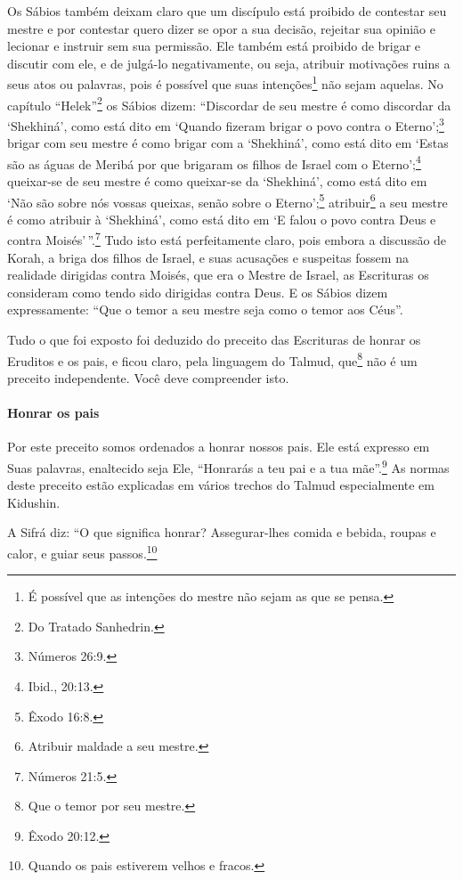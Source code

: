 Os Sábios também deixam claro que um discípulo está proibido de
contestar seu mestre e por contestar quero dizer se opor a sua decisão,
rejeitar sua opinião e lecionar e instruir sem sua permissão. Ele também
está proibido de brigar e discutir com ele, e de julgá-lo negativamente,
ou seja, atribuir motivações ruins a seus atos ou palavras, pois é
possível que suas intenções\footnote{É possível que as intenções do mestre não sejam as que se pensa.} não
sejam aquelas. No capítulo ``Helek''\footnote{Do Tratado Sanhedrin.} os Sábios
dizem: ``Discordar de seu mestre
é como discordar da `Shekhiná', como está dito em `Quando fizeram brigar
o povo contra o Eterno';\footnote{Números 26:9.} brigar com seu mestre é como
brigar com a `Shekhiná', como está dito em `Estas são as águas de Meribá
por que brigaram os filhos de Israel com o Eterno';\footnote{Ibid., 20:13.}
queixar-se de seu mestre
é como queixar-se da `Shekhiná', como está dito em `Não são sobre nós
vossas queixas, senão sobre o Eterno';\footnote{Êxodo 16:8.}
atribuir\footnote{Atribuir maldade a seu mestre.} a seu mestre é como
atribuir à `Shekhiná', como está dito em `E falou o povo contra Deus e
contra Moisés'\,''.\footnote{Números 21:5.} Tudo isto está perfeitamente claro, pois
embora a discussão de Korah, a briga dos filhos de Israel, e suas
acusações e suspeitas fossem na realidade dirigidas contra Moisés, que
era o Mestre de Israel, as Escrituras os consideram como tendo sido
dirigidas contra Deus. E os Sábios dizem expressamente: ``Que o temor a
seu mestre seja como o temor aos Céus''.

Tudo o que foi exposto foi deduzido do preceito das Escrituras de honrar
os Eruditos e os pais, e ficou claro, pela linguagem do Talmud,
que\footnote{Que o temor por seu mestre.} não é um preceito independente. Você deve
compreender isto.

\paragraph{Honrar os pais}

Por este preceito somos ordenados a honrar nossos pais. Ele está
expresso em Suas palavras, enaltecido seja Ele, ``Honrarás a teu pai e a
tua mãe''.\footnote{Êxodo 20:12.} As normas deste preceito estão explicadas em
vários trechos do Talmud especialmente em Kidushin.

A Sifrá diz: ``O que significa honrar? Assegurar-lhes comida e bebida, roupas e calor, e guiar seus passos.\footnote{Quando os pais estiverem velhos e fracos.}


